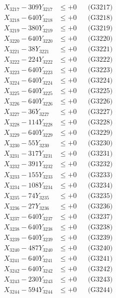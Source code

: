 \documentclass[a4paper,10pt]{article}
\begin{document}
{\begin{align}
X_{3217} - 309Y_{3217} &\leq +0 && \text{(G3217)} \\
X_{3218} - 640Y_{3218} &\leq +0 && \text{(G3218)} \\
X_{3219} - 380Y_{3219} &\leq +0 && \text{(G3219)} \\
X_{3220} - 640Y_{3220} &\leq +0 && \text{(G3220)} \\
\allowbreak
X_{3221} - 38Y_{3221} &\leq +0 && \text{(G3221)} \\
X_{3222} - 224Y_{3222} &\leq +0 && \text{(G3222)} \\
X_{3223} - 640Y_{3223} &\leq +0 && \text{(G3223)} \\
X_{3224} - 640Y_{3224} &\leq +0 && \text{(G3224)} \\
X_{3225} - 640Y_{3225} &\leq +0 && \text{(G3225)} \\
X_{3226} - 640Y_{3226} &\leq +0 && \text{(G3226)} \\
X_{3227} - 36Y_{3227} &\leq +0 && \text{(G3227)} \\
X_{3228} - 114Y_{3228} &\leq +0 && \text{(G3228)} \\
X_{3229} - 640Y_{3229} &\leq +0 && \text{(G3229)} \\
X_{3230} - 55Y_{3230} &\leq +0 && \text{(G3230)} \\
\allowbreak
X_{3231} - 317Y_{3231} &\leq +0 && \text{(G3231)} \\
X_{3232} - 391Y_{3232} &\leq +0 && \text{(G3232)} \\
X_{3233} - 155Y_{3233} &\leq +0 && \text{(G3233)} \\
X_{3234} - 108Y_{3234} &\leq +0 && \text{(G3234)} \\
X_{3235} - 74Y_{3235} &\leq +0 && \text{(G3235)} \\
X_{3236} - 27Y_{3236} &\leq +0 && \text{(G3236)} \\
X_{3237} - 640Y_{3237} &\leq +0 && \text{(G3237)} \\
X_{3238} - 640Y_{3238} &\leq +0 && \text{(G3238)} \\
X_{3239} - 640Y_{3239} &\leq +0 && \text{(G3239)} \\
X_{3240} - 487Y_{3240} &\leq +0 && \text{(G3240)} \\
\allowbreak
X_{3241} - 640Y_{3241} &\leq +0 && \text{(G3241)} \\
X_{3242} - 640Y_{3242} &\leq +0 && \text{(G3242)} \\
X_{3243} - 230Y_{3243} &\leq +0 && \text{(G3243)} \\
X_{3244} - 594Y_{3244} &\leq +0 && \text{(G3244)} \\

\end{align}}
\end{document}
